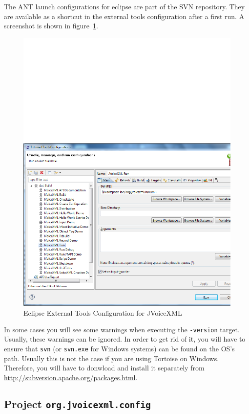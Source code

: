 \documentclass[11pt,a4paper]{article}
\begin{document}
The ANT launch configurations for eclipse are part of the SVN repository. They
are available as a shortcut in the external tools configuration after a first
run. A screenshot is shown in figure~\ref{fig:eclipse-launch}.
\begin{figure}
\includegraphics[width=\linewidth]{eclipse-launch.png}
\caption{Eclipse External Tools Configuration for JVoiceXML}
\label{fig:eclipse-launch}
\end{figure}

In some cases you will see some warnings when executing the
\lstinline{-version} target. Usually, these warnings can be ignored. In order
to get rid of it, you will have to ensure that \lstinline{svn} (or
\lstinline{svn.exe} for Windows systems) can be found on the OS's path. Usually
this is not the case if you are using Tortoise on Windows. Therefore, you will
have to donwload and install it separately from
\url{http://subversion.apache.org/packages.html}.

\subsection{Project \texttt{org.jvoicexml.config}}
\label{sec:org.jvoicexml.config}
\end{document}
